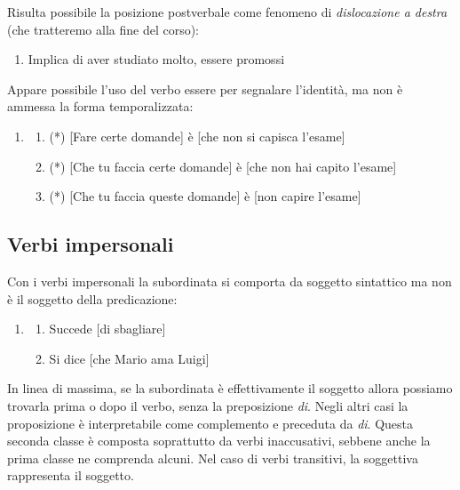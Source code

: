 \documentclass[
  a4paper,
  twoside,
  11pt,
  chapterprefix=false,
  bibliography=totocnumbered,
  listof=flat]{scrbook}
\providecommand{\tightlist}{%
  \setlength{\itemsep}{0pt}\setlength{\parskip}{0pt}}
\begin{document}
Risulta possibile la posizione postverbale come fenomeno di \emph{dislocazione a destra} (che tratteremo alla fine del corso):

\begin{enumerate}
\def\labelenumi{(\arabic{enumi})}
\setcounter{enumi}{39}
\tightlist
\item
  Implica di aver studiato molto, essere promossi
\end{enumerate}

Appare possibile l'uso del verbo essere per segnalare l'identità, ma non è ammessa la forma temporalizzata:

\begin{enumerate}
\def\labelenumi{(\arabic{enumi})}
\setcounter{enumi}{40}
\item
  \begin{enumerate}
  \def\labelenumii{\alph{enumii}.}
  \tightlist
  \item
    (*) {[}Fare certe domande{]} è {[}che non si capisca l'esame{]}
  \item
    (*) {[}Che tu faccia certe domande{]} è {[}che non hai capito l'esame{]}
  \item
    (*) {[}Che tu faccia queste domande{]} è {[}non capire l'esame{]}
  \end{enumerate}
\end{enumerate}

\hypertarget{verbi-impersonali}{%
\subsection{Verbi impersonali}\label{verbi-impersonali}}

Con i verbi impersonali la subordinata si comporta da soggetto sintattico ma non è il soggetto della predicazione:

\begin{enumerate}
\def\labelenumi{(\arabic{enumi})}
\setcounter{enumi}{41}
\item
  \begin{enumerate}
  \def\labelenumii{\alph{enumii}.}
  \tightlist
  \item
    Succede {[}di sbagliare{]}
  \item
    Si dice {[}che Mario ama Luigi{]}
  \end{enumerate}
\end{enumerate}

In linea di massima, se la subordinata è effettivamente il soggetto allora possiamo trovarla prima o dopo il verbo, senza la preposizione \emph{di}.
Negli altri casi la proposizione è interpretabile come complemento e preceduta da \emph{di}.
Questa seconda classe è composta soprattutto da verbi inaccusativi, sebbene anche la prima classe ne comprenda alcuni. Nel caso di verbi transitivi, la soggettiva rappresenta il soggetto.
\end{document}
